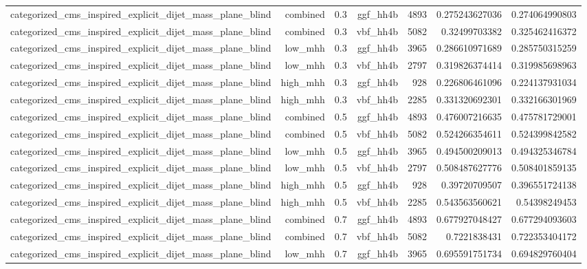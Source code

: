 \begin{table}[htbp]
{\begin{tabular}{lrrrrrr}
categorized\_cms\_inspired\_explicit\_dijet\_mass\_plane\_blind & combined & 0.3 & ggf\_hh4b & 4893 & 0.275243627036 & 0.274064990803 \\
categorized\_cms\_inspired\_explicit\_dijet\_mass\_plane\_blind & combined & 0.3 & vbf\_hh4b & 5082 & 0.32499703382 & 0.325462416372 \\
categorized\_cms\_inspired\_explicit\_dijet\_mass\_plane\_blind & low\_mhh & 0.3 & ggf\_hh4b & 3965 & 0.286610971689 & 0.285750315259 \\
categorized\_cms\_inspired\_explicit\_dijet\_mass\_plane\_blind & low\_mhh & 0.3 & vbf\_hh4b & 2797 & 0.319826374414 & 0.319985698963 \\
categorized\_cms\_inspired\_explicit\_dijet\_mass\_plane\_blind & high\_mhh & 0.3 & ggf\_hh4b & 928 & 0.226806461096 & 0.224137931034 \\
categorized\_cms\_inspired\_explicit\_dijet\_mass\_plane\_blind & high\_mhh & 0.3 & vbf\_hh4b & 2285 & 0.331320692301 & 0.332166301969 \\
categorized\_cms\_inspired\_explicit\_dijet\_mass\_plane\_blind & combined & 0.5 & ggf\_hh4b & 4893 & 0.476007216635 & 0.475781729001 \\
categorized\_cms\_inspired\_explicit\_dijet\_mass\_plane\_blind & combined & 0.5 & vbf\_hh4b & 5082 & 0.524266354611 & 0.524399842582 \\
categorized\_cms\_inspired\_explicit\_dijet\_mass\_plane\_blind & low\_mhh & 0.5 & ggf\_hh4b & 3965 & 0.494500209013 & 0.494325346784 \\
categorized\_cms\_inspired\_explicit\_dijet\_mass\_plane\_blind & low\_mhh & 0.5 & vbf\_hh4b & 2797 & 0.508487627776 & 0.508401859135 \\
categorized\_cms\_inspired\_explicit\_dijet\_mass\_plane\_blind & high\_mhh & 0.5 & ggf\_hh4b & 928 & 0.39720709507 & 0.396551724138 \\
categorized\_cms\_inspired\_explicit\_dijet\_mass\_plane\_blind & high\_mhh & 0.5 & vbf\_hh4b & 2285 & 0.543563560621 & 0.54398249453 \\
categorized\_cms\_inspired\_explicit\_dijet\_mass\_plane\_blind & combined & 0.7 & ggf\_hh4b & 4893 & 0.677927048427 & 0.677294093603 \\
categorized\_cms\_inspired\_explicit\_dijet\_mass\_plane\_blind & combined & 0.7 & vbf\_hh4b & 5082 & 0.7221838431 & 0.722353404172 \\
categorized\_cms\_inspired\_explicit\_dijet\_mass\_plane\_blind & low\_mhh & 0.7 & ggf\_hh4b & 3965 & 0.695591751734 & 0.694829760404 \\

\end{tabular}}
\end{table}
